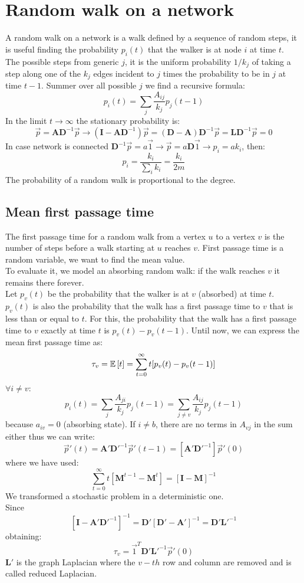 \section{Random walk on a network}
A random walk on a network is a walk defined by a sequence of random steps, it is useful finding the probability $p_i(t)$ that the walker is at node $i$ at time $t$.\\
The possible steps from generic $j$, it is the uniform probability $1/k_j$ of taking a step along one of the $k_j$ edges incident to $j$ times the probability to be in $j$ at time $t-1$. Summer over all possible $j$ we find a recursive formula:
\[
p_i(t) = \sum_j \frac{A_{ij}}{k_j} p_j(t-1)
\] 
In the limit $t\to \infty$ the stationary probability is:
\[
\vec{p} = \mathbf{A}\mathbf{D}^{-1}\vec{p} \to (\mathbf{I} - \mathbf{A}\mathbf{D}^{-1})\vec{p} = (\mathbf{D}-\mathbf{A})\mathbf{D}^{-1}\vec{p} = \mathbf{L}\mathbf{D}^{-1}\vec{p}=0
\]
In case network is connected $\mathbf{D}^{-1}\vec{p} =a\vec{1} \to \vec{p} = a\mathbf{D}\vec{1} \to p_i = ak_i$, then:
\[
p_i = \frac{k_i}{\sum_i k_i} = \frac{k_i}{2m}
\]
The probability of a random walk is proportional to the degree.
\subsection{Mean first passage time}
The first passage time for a random walk from a vertex $u$ to a vertex $v$ is the number of steps before a walk starting at $u$ reaches $v$. First passage time is a random variable, we want to find the mean value.\\
To evaluate it, we model an absorbing random walk: if the walk reaches $v$ it remains there forever.\\
Let $p_v(t)$ be the probability that the walker is at $v$  (absorbed) at time $t$.\\
$p_v(t)$ is also the probability that the walk has a first passage time to $v$ that is less than or equal to $t$. For this, the probability that the walk has a first passage time to $v$ exactly at time $t$ is $p_v(t) - p_v(t-1)$. Until now, we can express the mean first passage time as:
\[
\tau_v = \mathbb{E}\left[t\right] = \sum_{t =0}^{\infty} t[p_v(t) - p_v (t-1)]
\]
$\forall i \neq v$:
\[
p_i(t) = \sum_j \frac{A_{ji}}{k_j}p_j(t-1) = \sum_{j \neq v} \frac{A_{ij}}{k_j} p_j (t-1)
\]
because $a_{iv} = 0$ (absorbing state). If $i\neq b$, there are no terms in $A_{vj}$ in the sum either thus we can write:
\[
\vec{p}'(t) = \mathbf{A}'\mathbf{D}'^{-1}\vec{p}'(t-1) = [\mathbf{A}'\mathbf{D}'^{-1}]\vec{p}'(0)
\]
where we have used:
\[
\sum_{t=0}^{\infty} t [ \mathbf{M}^{t-1} - \mathbf{M}^t] = [\mathbf{I} - \mathbf{M}]^{-1}
\]
We transformed a stochastic problem in a deterministic one.\\
Since
\[
[\mathbf{I} - \mathbf{A}'\mathbf{D}'^{-1}]^{-1} = \mathbf{D}'[\mathbf{D}'- \mathbf{A}']^{-1} = \mathbf{D}'\mathbf{L}'^{-1}
\]
obtaining:
\[
\tau_v = \vec{1}^T \mathbf{D}'\mathbf{L}'^{-1}\vec{p}'(0)
\]
$\mathbf{L}'$ is the graph Laplacian where the $v-th$ row and column are removed and is called reduced Laplacian.\\
